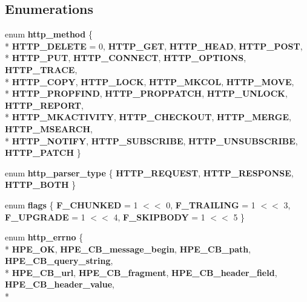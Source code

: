 \subsection*{Enumerations}
\begin{DoxyCompactItemize}
\item 
enum {\bf http\+\_\+method} \{ \\*
{\bf H\+T\+T\+P\+\_\+\+D\+E\+L\+E\+TE} = 0, 
{\bf H\+T\+T\+P\+\_\+\+G\+ET}, 
{\bf H\+T\+T\+P\+\_\+\+H\+E\+AD}, 
{\bf H\+T\+T\+P\+\_\+\+P\+O\+ST}, 
\\*
{\bf H\+T\+T\+P\+\_\+\+P\+UT}, 
{\bf H\+T\+T\+P\+\_\+\+C\+O\+N\+N\+E\+CT}, 
{\bf H\+T\+T\+P\+\_\+\+O\+P\+T\+I\+O\+NS}, 
{\bf H\+T\+T\+P\+\_\+\+T\+R\+A\+CE}, 
\\*
{\bf H\+T\+T\+P\+\_\+\+C\+O\+PY}, 
{\bf H\+T\+T\+P\+\_\+\+L\+O\+CK}, 
{\bf H\+T\+T\+P\+\_\+\+M\+K\+C\+OL}, 
{\bf H\+T\+T\+P\+\_\+\+M\+O\+VE}, 
\\*
{\bf H\+T\+T\+P\+\_\+\+P\+R\+O\+P\+F\+I\+ND}, 
{\bf H\+T\+T\+P\+\_\+\+P\+R\+O\+P\+P\+A\+T\+CH}, 
{\bf H\+T\+T\+P\+\_\+\+U\+N\+L\+O\+CK}, 
{\bf H\+T\+T\+P\+\_\+\+R\+E\+P\+O\+RT}, 
\\*
{\bf H\+T\+T\+P\+\_\+\+M\+K\+A\+C\+T\+I\+V\+I\+TY}, 
{\bf H\+T\+T\+P\+\_\+\+C\+H\+E\+C\+K\+O\+UT}, 
{\bf H\+T\+T\+P\+\_\+\+M\+E\+R\+GE}, 
{\bf H\+T\+T\+P\+\_\+\+M\+S\+E\+A\+R\+CH}, 
\\*
{\bf H\+T\+T\+P\+\_\+\+N\+O\+T\+I\+FY}, 
{\bf H\+T\+T\+P\+\_\+\+S\+U\+B\+S\+C\+R\+I\+BE}, 
{\bf H\+T\+T\+P\+\_\+\+U\+N\+S\+U\+B\+S\+C\+R\+I\+BE}, 
{\bf H\+T\+T\+P\+\_\+\+P\+A\+T\+CH}
 \}
\item 
enum {\bf http\+\_\+parser\+\_\+type} \{ {\bf H\+T\+T\+P\+\_\+\+R\+E\+Q\+U\+E\+ST}, 
{\bf H\+T\+T\+P\+\_\+\+R\+E\+S\+P\+O\+N\+SE}, 
{\bf H\+T\+T\+P\+\_\+\+B\+O\+TH}
 \}
\item 
enum {\bf flags} \{ {\bf F\+\_\+\+C\+H\+U\+N\+K\+ED} = 1 $<$$<$ 0, 
{\bf F\+\_\+\+T\+R\+A\+I\+L\+I\+NG} = 1 $<$$<$ 3, 
{\bf F\+\_\+\+U\+P\+G\+R\+A\+DE} = 1 $<$$<$ 4, 
{\bf F\+\_\+\+S\+K\+I\+P\+B\+O\+DY} = 1 $<$$<$ 5
 \}
\item 
enum {\bf http\+\_\+errno} \{ \\*
{\bf H\+P\+E\+\_\+\+OK}, 
{\bf H\+P\+E\+\_\+\+C\+B\+\_\+message\+\_\+begin}, 
{\bf H\+P\+E\+\_\+\+C\+B\+\_\+path}, 
{\bf H\+P\+E\+\_\+\+C\+B\+\_\+query\+\_\+string}, 
\\*
{\bf H\+P\+E\+\_\+\+C\+B\+\_\+url}, 
{\bf H\+P\+E\+\_\+\+C\+B\+\_\+fragment}, 
{\bf H\+P\+E\+\_\+\+C\+B\+\_\+header\+\_\+field}, 
{\bf H\+P\+E\+\_\+\+C\+B\+\_\+header\+\_\+value}, 
\\*

\end{DoxyCompactItemize}
